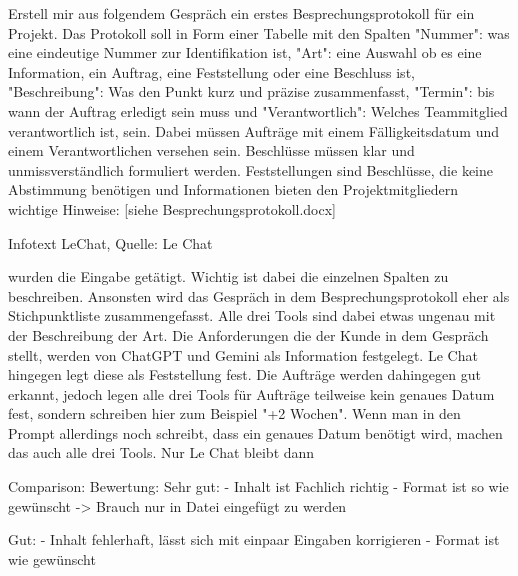         \begin{prompt}[H]
            \begin{tcolorbox}[colback=gray!20, colframe=gray!20, boxrule=0pt, sharp corners] 
                Erstell mir aus folgendem Gespräch ein erstes Besprechungsprotokoll für ein Projekt. Das Protokoll soll in 
                Form einer Tabelle mit den Spalten "Nummer": was eine eindeutige Nummer zur Identifikation ist, "Art": eine 
                Auswahl ob es eine Information, ein Auftrag, eine Feststellung oder eine Beschluss ist, "Beschreibung": Was 
                den Punkt kurz und präzise zusammenfasst, "Termin": bis wann der Auftrag erledigt sein muss und 
                "Verantwortlich": Welches Teammitglied verantwortlich ist, sein. Dabei müssen Aufträge mit einem 
                Fälligkeitsdatum und einem Verantwortlichen versehen sein. Beschlüsse müssen klar und unmissverständlich 
                formuliert werden. Feststellungen sind Beschlüsse, die keine Abstimmung benötigen und Informationen bieten 
                den Projektmitgliedern wichtige Hinweise: [siehe Besprechungsprotokoll.docx]
                \vfill
            \end{tcolorbox}
            \caption{Infotext LeChat, Quelle: Le Chat}
            \label{InfotextLeChat}
        \end{prompt}
    
        wurden die Eingabe getätigt. Wichtig ist dabei die einzelnen Spalten zu beschreiben. Ansonsten wird das Gespräch in dem 
        Besprechungsprotokoll eher als Stichpunktliste zusammengefasst. Alle drei Tools sind dabei etwas ungenau mit der 
        Beschreibung der Art. Die Anforderungen die der Kunde in dem Gespräch stellt, werden von ChatGPT und Gemini als 
        Information festgelegt. Le Chat hingegen legt diese als Feststellung fest. Die Aufträge werden dahingegen gut 
        erkannt, jedoch legen alle drei Tools für Aufträge teilweise kein genaues Datum fest, sondern schreiben hier zum 
        Beispiel "+2 Wochen". Wenn man in den Prompt allerdings noch schreibt, dass ein genaues Datum benötigt wird, machen 
        das auch alle drei Tools. Nur Le Chat bleibt dann 

Comparison:
    Bewertung:
        Sehr gut:
        - Inhalt ist Fachlich richtig
        - Format ist so wie gewünscht
        -> Brauch nur in Datei eingefügt zu werden
        
        Gut:
        - Inhalt fehlerhaft, lässt sich mit einpaar Eingaben korrigieren
        - Format ist wie gewünscht
        
